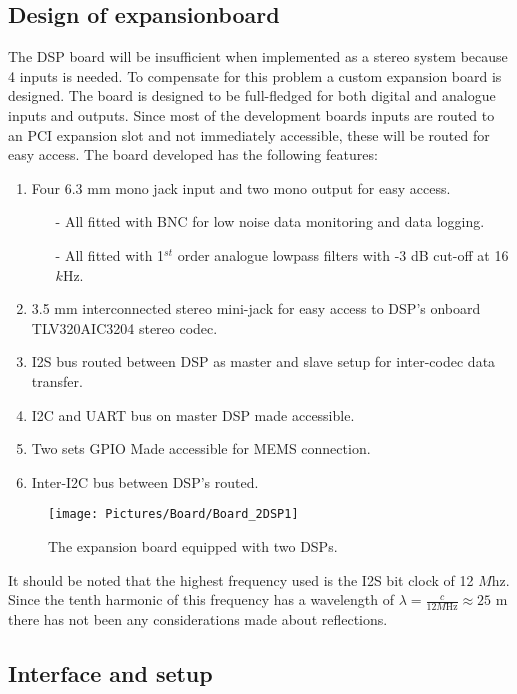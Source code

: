 \subsection{Design of expansionboard}\label{subsec:DesignOfExpansion}

The DSP board will be insufficient when implemented as a stereo system because 4 inputs is needed. To compensate for this problem a custom expansion board is designed. The board is designed to be full-fledged for both digital and analogue inputs and outputs. Since most of the development boards inputs are routed to an PCI expansion slot and not immediately accessible, these will be routed for easy access. The board developed has the following features:

\begin{enumerate}
	\item Four 6.3 mm mono jack input and two mono output for easy access.
	\begin{itemize}
		\item[-] All fitted with BNC for low noise data monitoring and data logging.
		\item[-] All fitted with 1$^{st}$ order analogue lowpass filters with -3 dB cut-off at 16 $k$Hz.
	\end{itemize}
	\item 3.5 mm interconnected stereo mini-jack for easy access to DSP's onboard TLV320AIC3204 stereo codec.
	\item I2S bus routed between DSP as master and slave setup for inter-codec data transfer.
	\item I2C and UART bus on master DSP made accessible.
	\item Two sets GPIO Made accessible for MEMS connection.
	\item Inter-I2C bus between DSP's routed. 
\end{enumerate}

\begin{figure}[H]
	\centering
	\texttt{[image: Pictures/Board/Board\_2DSP1]}	
	\caption{The expansion board equipped with two DSPs.}
	\label{fig:PCBboard}
\end{figure}

It should be noted that the highest frequency used is the I2S bit clock of 12 $M$hz. Since the tenth harmonic of this frequency has a wavelength of $\lambda=\frac{c}{12M \text{Hz}}\approx25\text{ m}$ there has not been any considerations made about reflections.


\subsection{Interface and setup}\label{subsec:Interface}

